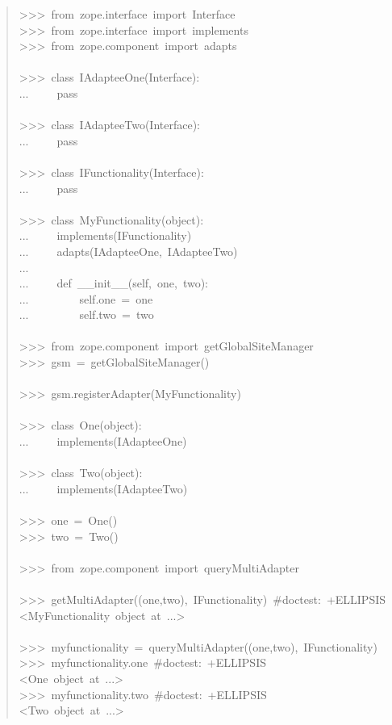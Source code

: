 \documentclass[14pt,a4paper,openany,twoside,final]{extbook}
\begin{document}
\begin{quote}{\ttfamily \raggedright \noindent
>{}>{}>~from~zope.interface~import~Interface\\
>{}>{}>~from~zope.interface~import~implements\\
>{}>{}>~from~zope.component~import~adapts\\
~\\
>{}>{}>~class~IAdapteeOne(Interface):\\
...~~~~~pass\\
~\\
>{}>{}>~class~IAdapteeTwo(Interface):\\
...~~~~~pass\\
~\\
>{}>{}>~class~IFunctionality(Interface):\\
...~~~~~pass\\
~\\
>{}>{}>~class~MyFunctionality(object):\\
...~~~~~implements(IFunctionality)\\
...~~~~~adapts(IAdapteeOne,~IAdapteeTwo)\\
...\\
...~~~~~def~\_\_init\_\_(self,~one,~two):\\
...~~~~~~~~~self.one~=~one\\
...~~~~~~~~~self.two~=~two\\
~\\
>{}>{}>~from~zope.component~import~getGlobalSiteManager\\
>{}>{}>~gsm~=~getGlobalSiteManager()\\
~\\
>{}>{}>~gsm.registerAdapter(MyFunctionality)\\
~\\
>{}>{}>~class~One(object):\\
...~~~~~implements(IAdapteeOne)\\
~\\
>{}>{}>~class~Two(object):\\
...~~~~~implements(IAdapteeTwo)\\
~\\
>{}>{}>~one~=~One()\\
>{}>{}>~two~=~Two()\\
~\\
>{}>{}>~from~zope.component~import~queryMultiAdapter\\
~\\
>{}>{}>~getMultiAdapter((one,two),~IFunctionality)~\#doctest:~+ELLIPSIS\\
<MyFunctionality~object~at~...>\\
~\\
>{}>{}>~myfunctionality~=~queryMultiAdapter((one,two),~IFunctionality)\\
>{}>{}>~myfunctionality.one~\#doctest:~+ELLIPSIS\\
<One~object~at~...>\\
>{}>{}>~myfunctionality.two~\#doctest:~+ELLIPSIS\\
<Two~object~at~...>
}
\end{quote}
\end{document}
